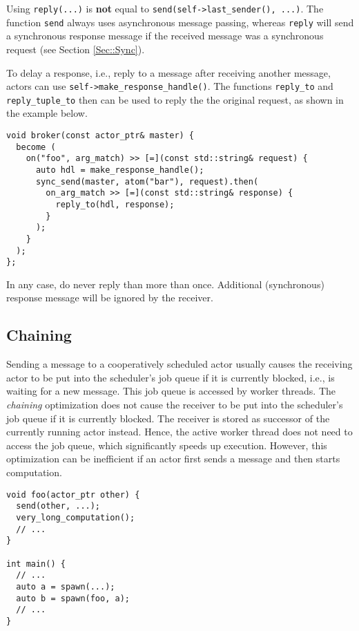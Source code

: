 Using \lstinline^reply(...)^ is \textbf{not} equal to \lstinline^send(self->last_sender(), ...)^.
The function \lstinline^send^ always uses asynchronous message passing, whereas \lstinline^reply^ will send a synchronous response message if the received message was a synchronous request (see Section \ref{Sec::Sync}).

To delay a response, i.e., reply to a message after receiving another message, actors can use \lstinline^self->make_response_handle()^.
The functions \lstinline^reply_to^ and \lstinline^reply_tuple_to^ then can be used to reply the the original request, as shown in the example below.

\begin{lstlisting}
void broker(const actor_ptr& master) {
  become (
    on("foo", arg_match) >> [=](const std::string& request) {
      auto hdl = make_response_handle();
      sync_send(master, atom("bar"), request).then(
        on_arg_match >> [=](const std::string& response) {
          reply_to(hdl, response);
        }
      );
    }
  );
};
\end{lstlisting}

In any case, do never reply than more than once.
Additional (synchronous) response message will be ignored by the receiver.

\clearpage
\subsection{Chaining}
\label{Sec::Send::ChainedSend}

Sending a message to a cooperatively scheduled actor usually causes the receiving actor to be put into the scheduler's job queue if it is currently blocked, i.e., is waiting for a new message.
This job queue is accessed by worker threads.
The \textit{chaining} optimization does not cause the receiver to be put into the scheduler's job queue if it is currently blocked.
The receiver is stored as successor of the currently running actor instead.
Hence, the active worker thread does not need to access the job queue, which significantly speeds up execution.
However, this optimization can be inefficient if an actor first sends a message and then starts computation.

\begin{lstlisting}
void foo(actor_ptr other) {
  send(other, ...);
  very_long_computation();
  // ...
}

int main() {
  // ...
  auto a = spawn(...);
  auto b = spawn(foo, a);
  // ...
}
\end{lstlisting}

